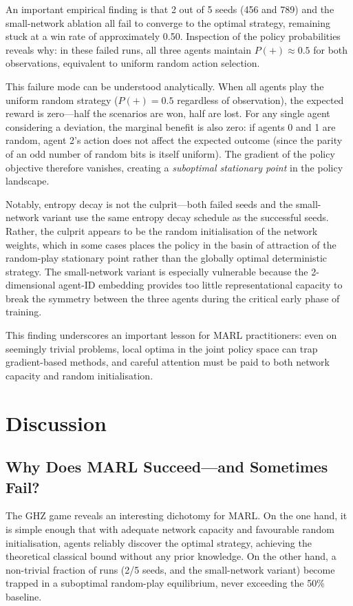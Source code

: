 \documentclass[conference]{IEEEtran}
\begin{document}
An important empirical finding is that 2 out of 5 seeds (456 and 789) and the small-network ablation all fail to converge to the optimal strategy, remaining stuck at a win rate of approximately 0.50. Inspection of the policy probabilities reveals why: in these failed runs, all three agents maintain $P(+) \approx 0.5$ for both observations, equivalent to uniform random action selection.

This failure mode can be understood analytically. When all agents play the uniform random strategy ($P(+)=0.5$ regardless of observation), the expected reward is zero---half the scenarios are won, half are lost. For any single agent considering a deviation, the marginal benefit is also zero: if agents 0 and 1 are random, agent 2's action does not affect the expected outcome (since the parity of an odd number of random bits is itself uniform). The gradient of the policy objective therefore vanishes, creating a \emph{suboptimal stationary point} in the policy landscape.

Notably, entropy decay is not the culprit---both failed seeds and the small-network variant use the same entropy decay schedule as the successful seeds. Rather, the culprit appears to be the random initialisation of the network weights, which in some cases places the policy in the basin of attraction of the random-play stationary point rather than the globally optimal deterministic strategy. The small-network variant is especially vulnerable because the 2-dimensional agent-ID embedding provides too little representational capacity to break the symmetry between the three agents during the critical early phase of training.

This finding underscores an important lesson for MARL practitioners: even on seemingly trivial problems, local optima in the joint policy space can trap gradient-based methods, and careful attention must be paid to both network capacity and random initialisation.

\section{Discussion}

\subsection{Why Does MARL Succeed---and Sometimes Fail?}

The GHZ game reveals an interesting dichotomy for MARL. On the one hand, it is simple enough that with adequate network capacity and favourable random initialisation, agents reliably discover the optimal strategy, achieving the theoretical classical bound without any prior knowledge. On the other hand, a non-trivial fraction of runs (2/5 seeds, and the small-network variant) become trapped in a suboptimal random-play equilibrium, never exceeding the 50\% baseline.
\end{document}
